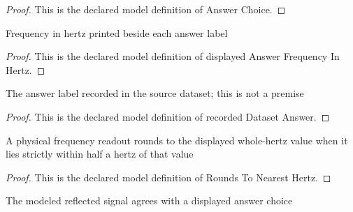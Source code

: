 \begin{proof}
  This is the declared model definition of Answer Choice.
\end{proof}
\begin{definition}
  \label{def:physics:phyx-mini-0319:phyxminiproblems-problemphyxmini0319-displayedanswerfrequencyinhertz}
  Frequency in hertz printed beside each answer label
\end{definition}
\begin{proof}
  This is the declared model definition of displayed Answer Frequency In Hertz.
\end{proof}
\begin{definition}
  \label{def:physics:phyx-mini-0319:phyxminiproblems-problemphyxmini0319-recordeddatasetanswer}
  The answer label recorded in the source dataset; this is not a premise
\end{definition}
\begin{proof}
  This is the declared model definition of recorded Dataset Answer.
\end{proof}
\begin{definition}
  \label{def:physics:phyx-mini-0319:phyxminiproblems-problemphyxmini0319-roundstonearesthertz}
  A physical frequency readout rounds to the displayed whole-hertz value when it lies strictly within half a hertz of that value
\end{definition}
\begin{proof}
  This is the declared model definition of Rounds To Nearest Hertz.
\end{proof}
\begin{definition}
  \label{def:physics:phyx-mini-0319:phyxminiproblems-problemphyxmini0319-matchesanswerchoice}
  The modeled reflected signal agrees with a displayed answer choice
\end{definition}
